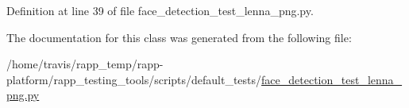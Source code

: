 Definition at line 39 of file face\-\_\-detection\-\_\-test\-\_\-lenna\-\_\-png.\-py.



The documentation for this class was generated from the following file\-:\begin{DoxyCompactItemize}
\item 
/home/travis/rapp\-\_\-temp/rapp-\/platform/rapp\-\_\-testing\-\_\-tools/scripts/default\-\_\-tests/\hyperlink{face__detection__test__lenna__png_8py}{face\-\_\-detection\-\_\-test\-\_\-lenna\-\_\-png.\-py}\end{DoxyCompactItemize}
